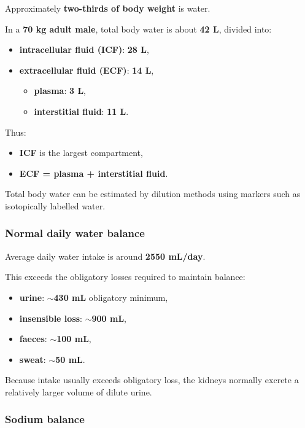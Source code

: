 \documentclass[11pt,a4paper]{article}
\begin{document}
Approximately \textbf{two-thirds of body weight} is water.

In a \textbf{70 kg adult male}, total body water is about \textbf{42 L}, divided into:
\begin{itemize}
    \item \textbf{intracellular fluid (ICF)}: \textbf{28 L},
    \item \textbf{extracellular fluid (ECF)}: \textbf{14 L},
    \begin{itemize}
        \item \textbf{plasma}: \textbf{3 L},
        \item \textbf{interstitial fluid}: \textbf{11 L}.
    \end{itemize}
\end{itemize}

Thus:
\begin{itemize}
    \item \textbf{ICF} is the largest compartment,
    \item \textbf{ECF = plasma + interstitial fluid}.
\end{itemize}

Total body water can be estimated by dilution methods using markers such as isotopically labelled water.

\subsubsection{Normal daily water balance}

Average daily water intake is around \textbf{2550 mL/day}.

This exceeds the obligatory losses required to maintain balance:
\begin{itemize}
    \item \textbf{urine}: \(\sim\)\textbf{430 mL} obligatory minimum,
    \item \textbf{insensible loss}: \(\sim\)\textbf{900 mL},
    \item \textbf{faeces}: \(\sim\)\textbf{100 mL},
    \item \textbf{sweat}: \(\sim\)\textbf{50 mL}.
\end{itemize}

Because intake usually exceeds obligatory loss, the kidneys normally excrete a relatively larger volume of dilute urine.

\subsubsection{Sodium balance}
\end{document}
